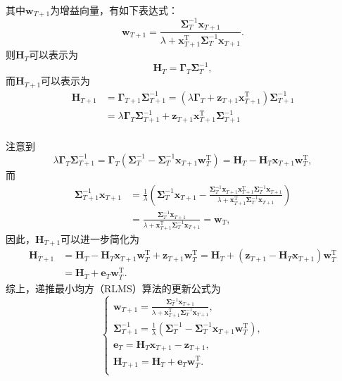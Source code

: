 其中\( \bm{w}_{T+1} \)为增益向量，有如下表达式：
\[
    \bm{w}_{T+1} = \frac{\mathbf{\Sigma}_T^{-1} \bm{x}_{T+1}}{\lambda + \bm{x}_{T+1}^\mathrm{T} \mathbf{\Sigma}_T^{-1} \bm{x}_{T+1}}.
\]
则\( \mathbf{H}_T \)可以表示为
\[
    \mathbf{H}_T = \mathbf{\Gamma}_T \mathbf{\Sigma}_T^{-1},
\]
而\( \mathbf{H}_{T+1} \)可以表示为
\[
    \begin{split}
        \mathbf{H}_{T+1} & = \mathbf{\Gamma}_{T+1} \mathbf{\Sigma}_{T+1}^{-1} = (\lambda \mathbf{\Gamma}_T + \bm{z}_{T+1}\bm{x}_{T+1}^\mathrm{T}) \mathbf{\Sigma}_{T+1}^{-1} \\
                         & = \lambda \mathbf{\Gamma}_T \mathbf{\Sigma}_{T+1}^{-1} + \bm{z}_{T+1}\bm{x}_{T+1}^\mathrm{T} \mathbf{\Sigma}_{T+1}^{-1}                           \\
    \end{split}
\]

注意到
\[
    \lambda \mathbf{\Gamma}_T \mathbf{\Sigma}_{T+1}^{-1} = \mathbf{\Gamma}_T \left(  \mathbf{\Sigma}_T^{-1} -  \mathbf{\Sigma}_{T}^{-1} \bm{x}_{T+1} \bm{w}_T^{\mathrm{T}} \right) = \mathbf{H}_T - \mathbf{H}_T \bm{x}_{T+1} \bm{w}_T^{\mathrm{T}},
\]
而
\[
    \begin{split}
        \mathbf{\Sigma}_{T + 1}^{-1} \bm{x}_{T+1} & = \frac{1}{\lambda} \left(  \mathbf{\Sigma}_T^{-1} \bm{x}_{T+1} - \frac{\mathbf{\Sigma}_{T}^{-1} \bm{x}_{T+1} \bm{x}_{T+1}^\mathrm{T} \mathbf{\Sigma}_{T}^{-1} \bm{x}_{T+1} }{\lambda + \bm{x}_{T+1}^\mathrm{T} \mathbf{\Sigma}_{T}^{-1} \bm{x}_{T+1}} \right) \\
                                                  & = \frac{ \mathbf{\Sigma}_T^{-1} \bm{x}_{T+1}}{\lambda + \bm{x}_{T+1}^\mathrm{T} \mathbf{\Sigma}_{T}^{-1} \bm{x}_{T+1}} = \bm{w}_T,
    \end{split}
\]
因此，\( \mathbf{H}_{T+1} \)可以进一步简化为
\[
    \begin{split}
        \mathbf{H}_{T+1} & = \mathbf{H}_T - \mathbf{H}_T \bm{x}_{T+1} \bm{w}_T^{\mathrm{T}}  + \bm{z}_{T+1} \bm{w}_T^{\mathrm{T}} = \mathbf{H}_T + (\bm{z}_{T+1} - \mathbf{H}_T \bm{x}_{T+1}) \bm{w}_T^{\mathrm{T}} \\
                         & = \mathbf{H}_T + \bm{e}_{T} \bm{w}_T^{\mathrm{T}}.
    \end{split}
\]
综上，递推最小均方（RLMS）算法的更新公式为
\[
    \begin{cases}
        \bm{w}_{T+1} = \frac{\mathbf{\Sigma}_T^{-1} \bm{x}_{T+1}}{\lambda + \bm{x}_{T+1}^\mathrm{T} \mathbf{\Sigma}_T^{-1} \bm{x}_{T+1}},                   \\
        \mathbf{\Sigma}_{T+1}^{-1} = \frac{1}{\lambda} \left( \mathbf{\Sigma}_T^{-1} - \mathbf{\Sigma}_{T}^{-1} \bm{x}_{T+1} \bm{w}_T^{\mathrm{T}} \right), \\
        \bm{e}_{T} = \mathbf{H}_{T}\bm{x}_{T+1} - \bm{z}_{T+1},                                                                                             \\
        \mathbf{H}_{T+1} = \mathbf{H}_T + \bm{e}_{T} \bm{w}_T^{\mathrm{T}}.                                                                                 \\
    \end{cases}
\]


